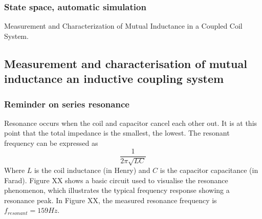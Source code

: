 \documentclass[conference]{IEEEtran}
\begin{document}
\subsubsection{State space, automatic simulation}
Measurement and Characterization of Mutual Inductance in a Coupled Coil System.

\subsection{Measurement and characterisation of mutual inductance an inductive coupling system}
\subsubsection{Reminder on series resonance}
Resonance occurs when the coil and capacitor cancel each other out. It is at this
point that the total impedance is the smallest, the lowest. The resonant frequency can
be expressed as
$$ \frac{1}{2\pi\sqrt{LC}}$$
Where \(L\) is the coil inductance (in Henry) and \(C\) is the capacitor capacitance (in Farad).
Figure XX shows a basic circuit used to visualise the resonance phenomenon, which
illustrates the typical frequency response showing a resonance peak. In Figure XX, the
measured resonance frequency is \(f_{resonant} = 159 Hz\).
\end{document}
